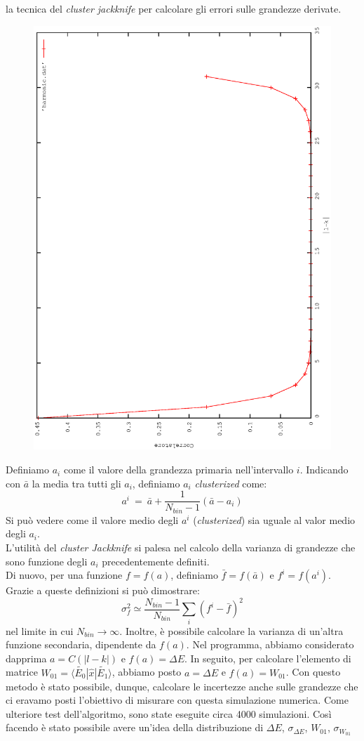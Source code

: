 la tecnica del \emph{cluster jackknife} per calcolare gli errori sulle grandezze derivate.\\
\begin{figure}[h]
 \centering
 \includegraphics[width= 0.5\columnwidth,angle= -90]{harmonic_giusto.eps}
\end{figure}

Definiamo $ a_i$ come il valore della grandezza primaria nell'intervallo $i$. Indicando con $\bar{a}$ la media tra tutti gli $a_i$, definiamo $a_i$ \emph{clusterized} come:
$$
a^i \ = \ \bar{a} + \frac{1}{N_{bin} -1} \left( \bar{a} - a_i\right) 
$$
Si può vedere come il valore medio degli $a^i$ (\emph{clusterized}) sia uguale al valor medio degli $a_i$.\\
L'utilità del \emph{cluster Jackknife} si palesa nel calcolo della varianza di grandezze che sono funzione degli $a_i$ precedentemente definiti.\\
Di nuovo, per una funzione $ f  =  f(a)$, definiamo $ \bar{f}  =  f(\bar{a})$ e $ f^i  =  f( a^i)$. Grazie a queste definizioni si può
dimostrare:
$$
 \sigma_f^2 \simeq \frac{ N_{bin} - 1}{N_{bin}} \sum_i \left( f^i - \bar{f} \right)^2
$$
nel limite in cui $N_{bin} \rightarrow \infty$. Inoltre, è possibile calcolare la varianza di un'altra funzione secondaria, dipendente da $f(a)$.
Nel programma, abbiamo considerato dapprima $ a = C( | l -k|) $ e $f(a) = \Delta E$.
In seguito, per calcolare l'elemento di matrice $ W_{01} =\langle \tilde{E_0} | \hat{x} | \tilde{E_1} \rangle $, abbiamo posto $a = \Delta E$ e $f(a) = W_{01}$.
Con questo metodo  è stato possibile, dunque, calcolare le incertezze anche sulle grandezze che ci eravamo posti l'obiettivo di misurare con questa simulazione numerica.
Come ulteriore test dell'algoritmo, sono state eseguite circa 4000 simulazioni.
Così facendo è stato possibile avere un'idea della distribuzione di $\Delta E$, $\sigma_{\Delta E}$, $W_{01}$, $\sigma_{W_{01}}$






